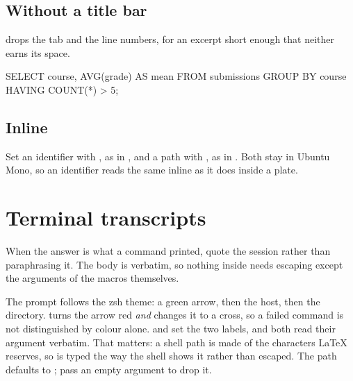 \documentclass[letterpaper,11pt]{article}
\begin{document}
\subsection{Without a title bar}

 drops the tab and the line numbers, for an excerpt short enough that neither earns its space.

\begin{codeplain}[sql]
SELECT course, AVG(grade) AS mean
  FROM submissions
 GROUP BY course
HAVING COUNT(*) > 5;
\end{codeplain}

\subsection{Inline}

Set an identifier with , as in , and a path with , as in .
Both stay in Ubuntu Mono, so an identifier reads the same inline as it does inside a plate.

\section{Terminal transcripts}

When the answer is what a command printed, quote the session rather than paraphrasing it.
The body is verbatim, so nothing inside needs escaping except the arguments of the macros themselves.

\begin{terminal}
\end{terminal}

The prompt follows the  zsh theme: a green arrow, then the host, then the directory.
 turns the arrow red \emph{and} changes it to a cross, so a failed command is not distinguished by colour alone.
 and  set the two labels, and both read their argument verbatim.
That matters: a shell path is made of the characters LaTeX reserves, so  is typed the way the shell shows it rather than escaped.
The path defaults to \code{\textasciitilde}; pass an empty argument to drop it.



\end{document}
